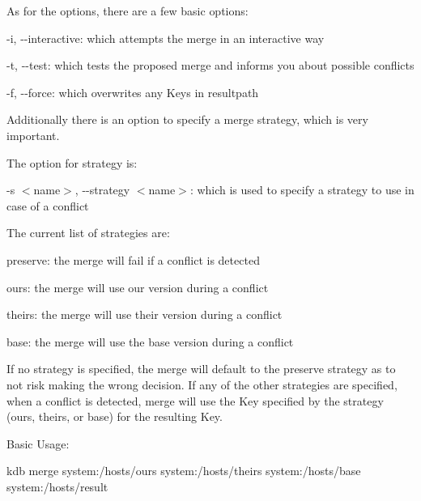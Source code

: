 As for the options, there are a few basic options\+:


\begin{DoxyItemize}
\item {\ttfamily -\/i}, {\ttfamily -\/-\/interactive}\+: which attempts the merge in an interactive way
\item {\ttfamily -\/t}, {\ttfamily -\/-\/test}\+: which tests the proposed merge and informs you about possible conflicts
\item {\ttfamily -\/f}, {\ttfamily -\/-\/force}\+: which overwrites any Keys in {\ttfamily resultpath}
\end{DoxyItemize}

Additionally there is an option to specify a merge strategy, which is very important.

The option for strategy is\+:


\begin{DoxyItemize}
\item {\ttfamily -\/s $<$name$>$}, {\ttfamily -\/-\/strategy $<$name$>$}\+: which is used to specify a strategy to use in case of a conflict
\end{DoxyItemize}

The current list of strategies are\+:


\begin{DoxyItemize}
\item {\ttfamily preserve}\+: the merge will fail if a conflict is detected
\item {\ttfamily ours}\+: the merge will use our version during a conflict
\item {\ttfamily theirs}\+: the merge will use their version during a conflict
\item {\ttfamily base}\+: the merge will use the base version during a conflict
\end{DoxyItemize}

If no strategy is specified, the merge will default to the preserve strategy as to not risk making the wrong decision. If any of the other strategies are specified, when a conflict is detected, merge will use the Key specified by the strategy ({\ttfamily ours}, {\ttfamily theirs}, or {\ttfamily base}) for the resulting Key.

Basic Usage\+:


\begin{DoxyCode}
kdb merge system:/hosts/ours system:/hosts/theirs system:/hosts/base system:/hosts/result
\end{DoxyCode}


